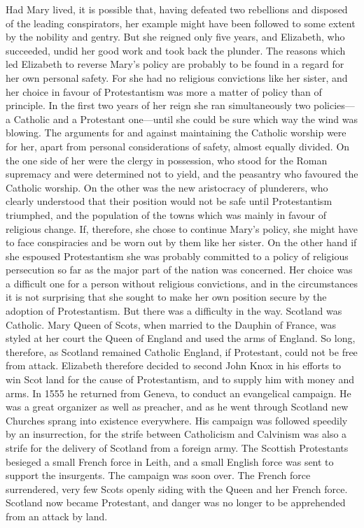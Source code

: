 \documentclass{book}
\begin{document}
Had Mary lived, it is possible that, having defeated two rebellions and disposed of the leading conspirators, her example might have been followed to some extent by the nobility and gentry. But she reigned only five years, and Elizabeth, who succeeded, undid her good work and took back the plunder. The reasons which led Elizabeth to reverse Mary’s policy are probably to be found in a regard for her own personal safety. For she had no religious convictions like her sister, and her choice in favour of Protestantism was more a matter of policy than of principle. In the first two years of her reign she ran simultaneously two policies—a Catholic and a Protestant one—until she could be sure which way the wind was blowing. The arguments for and against maintaining the Catholic worship were for her, apart from personal considerations of safety, almost equally divided. On the one side of her were the clergy in possession, who stood for the Roman supremacy and were determined not to yield, and the peasantry who favoured the Catholic worship. On the other was the new aristocracy of plunderers, who clearly understood that their position would not be safe until Protestantism triumphed, and the population of the towns which was mainly in favour of religious change. If, therefore, she chose to continue Mary’s policy, she might have to face conspiracies and be worn out by them like her sister. On the other hand if she espoused Protestantism she was probably committed to a policy of religious persecution so far as the major part of the nation was concerned. Her choice was a difficult one for a person without religious convictions, and in the circumstances it is not surprising that she sought to make her own position secure by the adoption of Protestantism. But there was a difficulty in the way. Scotland was Catholic. Mary Queen of Scots, when married to the Dauphin of France, was styled at her court the Queen of England and used the arms of England. So long, therefore, as Scotland remained Catholic England, if Protestant, could not be free from attack. Elizabeth therefore decided to second John Knox in his efforts to win Scot land for the cause of Protestantism, and to supply him with money and arms. In 1555 he returned from Geneva, to conduct an evangelical campaign. He was a great organizer as well as preacher, and as he went through Scotland new Churches sprang into existence everywhere. His campaign was followed speedily by an insurrection, for the strife between Catholicism and Calvinism was also a strife for the delivery of Scotland from a foreign army. The Scottish Protestants besieged a small French force in Leith, and a small English force was sent to support the insurgents. The campaign was soon over. The French force surrendered, very few Scots openly siding with the Queen and her French force. Scotland now became Protestant, and danger was no longer to be apprehended from an attack by land.
\end{document}
